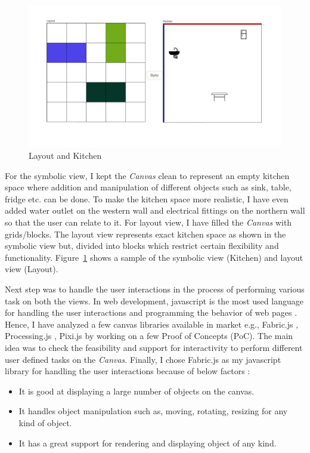 \begin{figure}
	\includegraphics[width=1\textwidth]{figures/Layout_Kitchen}
	\caption{Layout and Kitchen}
	\label{fig:Layout_Kitchen}
\end{figure}

For the symbolic view, I kept the \textit{Canvas} clean to represent an empty kitchen space where addition and manipulation of different objects such as sink, table, fridge etc. can be done. To make the kitchen space more realistic, I have even added {\color{blue} water outlet} on the western wall and {\color{red} electrical fittings} on the northern wall so that the user can relate to it. For layout view, I have filled the \textit{Canvas} with grids/blocks. The layout view represents exact kitchen space as shown in the symbolic view but, divided into blocks which restrict certain flexibility and functionality. Figure~\ref{fig:Layout_Kitchen} shows a sample of the symbolic view (Kitchen) and layout view (Layout).

Next step was to handle the user interactions in the process of performing various task on both the views. In web development, javascript is the most used language for handling the user interactions and programming the behavior of web pages \cite{javascript}. Hence, I have analyzed a few canvas libraries available in market e.g., Fabric.js \cite{fabricjs}, Processing.js \cite{processingjs}, Pixi.js \cite{pixijs}  by working on a few Proof of Concepts (PoC). The main idea was to check the feasibility and support for interactivity to perform different user defined tasks on the \textit{Canvas}. Finally, I chose Fabric.js as my javascript library for handling the user interactions because of below factors \cite{fabricjs}:
\begin{itemize}
	\item {It is good at displaying a large number of objects on the canvas.}
	\item {It handles object manipulation such as, moving, rotating, resizing for any kind of object.}
	\item {It has a great support for rendering and displaying object of any kind.}
\end{itemize}

